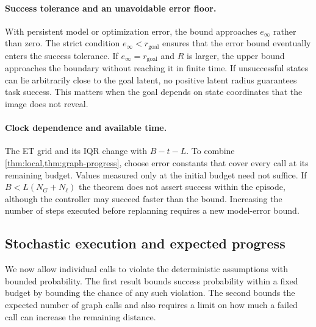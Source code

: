 \documentclass{article}
\theoremstyle{definition}
\theoremstyle{remark}
\begin{document}
\paragraph{Success tolerance and an unavoidable error floor.}
With persistent model or optimization error, the bound approaches $e_\infty$ rather
than zero. The strict condition $e_\infty<r_{\mathrm{goal}}$ ensures that the error bound
eventually enters the success tolerance. If $e_\infty=r_{\mathrm{goal}}$ and $R$ is larger,
the upper bound approaches the boundary without reaching it in finite time.
If unsuccessful states can lie arbitrarily close to the goal latent, no positive
latent radius guarantees task success. This matters when the goal depends on
state coordinates that the image does not reveal.

\paragraph{Clock dependence and available time.}
The ET grid and its IQR change with $B-t-L$.
To combine \cref{thm:local,thm:graph-progress}, choose error constants that cover every
call at its remaining budget. Values measured only at the initial budget need not suffice.
If $B<L(N_G+N_\ell)$ the theorem does not assert success within the episode,
although the controller may succeed faster than the bound.
Increasing the number of steps executed before replanning requires a new model-error bound.

\subsection{Stochastic execution and expected progress}
\label{app:stochastic}
We now allow individual calls to violate the deterministic assumptions with bounded probability.
The first result bounds success probability within a fixed budget by bounding the chance
of any such violation. The second bounds the expected number of graph calls and also
requires a limit on how much a failed call can increase the remaining distance.
\end{document}
